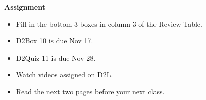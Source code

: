 \begin{center}
  {\large\bf Assignment}
\end{center}

\begin{itemize}
\item Fill in the bottom 3 boxes in column 3 of the Review Table. 
\item D2Box 10 is due Nov 17.  
\item D2Quiz 11 is due Nov 28.  
\item Watch videos assigned on D2L.
\item Read the next two pages before your next class.
\end{itemize}
